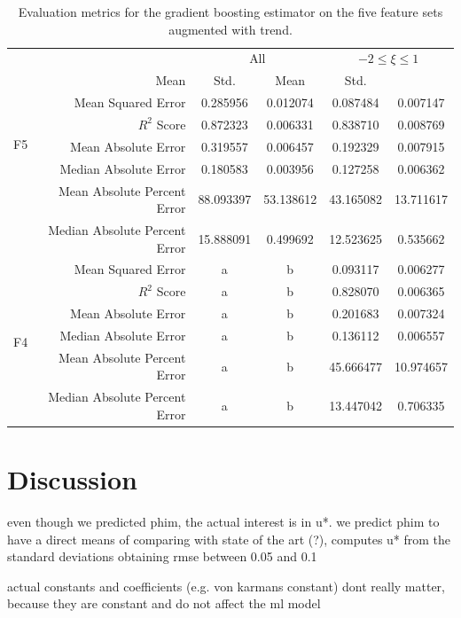 \documentclass[12pt]{book}
\begin{document}
\begin{table}[]
\centering
\caption{Evaluation metrics for the gradient boosting estimator on the five feature sets augmented with trend.}
\label{tbl:gb_results_f5t}
\begin{tabular}{c|r|c|c|c|c}
& & \multicolumn{2}{c|}{All} & \multicolumn{2}{c}{$-2\le\xi\le1$} \\
\multirow{6}{*}{F5} & Mean & Std. & Mean & Std.   \\ \hline
& Mean Squared Error 					& 0.285956	& 0.012074 & 0.087484    & 0.007147    \\  
& $R^2$ Score									& 0.872323   & 0.006331   & 0.838710    & 0.008769    \\
& Mean Absolute Error 					& 0.319557   & 0.006457 & 0.192329    & 0.007915    \\
& Median Absolute Error 				& 0.180583  	& 0.003956   & 0.127258    & 0.006362   \\
& Mean Absolute Percent Error		& 88.093397	& 53.138612  & 43.165082   & 13.711617   \\
& Median Absolute Percent Error	& 15.888091	& 0.499692 & 12.523625    & 0.535662   \\ \hline
\multirow{6}{*}{F4} & Mean Squared Error 					& a & b & 0.093117   & 0.006277   \\ 
& $R^2$ Score									& a & b & 0.828070   & 0.006365   \\
& Mean Absolute Error 					& a & b & 0.201683      & 0.007324   \\
& Median Absolute Error 				& a & b & 0.136112   & 0.006557   \\
& Mean Absolute Percent Error  	& a & b & 45.666477  & 10.974657  \\
& Median Absolute Percent Error	& a & b & 13.447042   & 0.706335  \\ \hline
\end{tabular}
\end{table}




\chapter{Discussion}
\label{ch:discussion}
even though we predicted phim, the actual interest is in u*. we predict phim to have a direct means of comparing with state of the art (?), \cite{weber1999} computes u* from the standard deviations obtaining rmse between 0.05 and 0.1

actual constants and coefficients (e.g. von karmans constant) dont really matter, because they are constant and do not affect the ml model 
\end{document}
